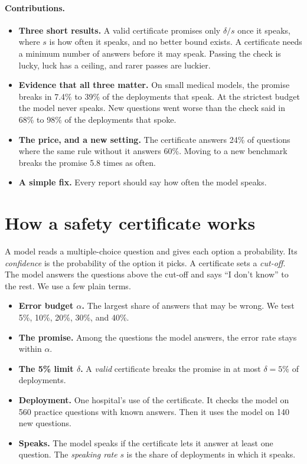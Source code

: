 \documentclass[11pt]{article}
\theoremstyle{plain}
\theoremstyle{definition}
\begin{document}
\paragraph{Contributions.}
\begin{itemize}[leftmargin=1.4em]
    \item \textbf{Three short results.} A valid certificate promises only $\delta/s$ once it speaks, where $s$ is how often it speaks, and no better bound exists. A certificate needs a minimum number of answers before it may speak. Passing the check is lucky, luck has a ceiling, and rarer passes are luckier.
    \item \textbf{Evidence that all three matter.} On small medical models, the promise breaks in 7.4\% to 39\% of the deployments that speak. At the strictest budget the model never speaks. New questions went worse than the check said in 68\% to 98\% of the deployments that spoke.
    \item \textbf{The price, and a new setting.} The certificate answers 24\% of questions where the same rule without it answers 60\%. Moving to a new benchmark breaks the promise 5.8 times as often.
    \item \textbf{A simple fix.} Every report should say how often the model speaks.
\end{itemize}

\section{How a safety certificate works}
\label{sec:certificate}

A model reads a multiple-choice question and gives each option a probability. Its \emph{confidence} is the probability of the option it picks. A certificate sets a \emph{cut-off}. The model answers the questions above the cut-off and says ``I don't know'' to the rest. We use a few plain terms.

\begin{itemize}[leftmargin=1.4em]
    \item \textbf{Error budget $\alpha$.} The largest share of answers that may be wrong. We test 5\%, 10\%, 20\%, 30\%, and 40\%.
    \item \textbf{The promise.} Among the questions the model answers, the error rate stays within $\alpha$.
    \item \textbf{The 5\% limit $\delta$.} A \emph{valid} certificate breaks the promise in at most $\delta = 5\%$ of deployments.
    \item \textbf{Deployment.} One hospital's use of the certificate. It checks the model on 560 practice questions with known answers. Then it uses the model on 140 new questions.
    \item \textbf{Speaks.} The model speaks if the certificate lets it answer at least one question. The \emph{speaking rate} $s$ is the share of deployments in which it speaks.
\end{itemize}
\end{document}
